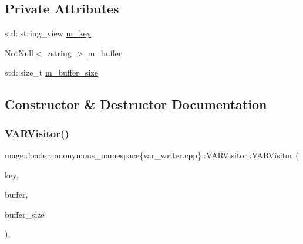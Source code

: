 \subsection*{Private Attributes}
\begin{DoxyCompactItemize}
\item 
std\+::string\+\_\+view \mbox{\hyperlink{classmage_1_1loader_1_1anonymous__namespace_02var__writer_8cpp_03_1_1_v_a_r_visitor_a405fafa3ab059442ca8e741d71a3c4d0}{m\+\_\+key}}
\item 
\mbox{\hyperlink{namespacemage_a8769f9d670d6b585ea306cb1062af94b}{Not\+Null}}$<$ \mbox{\hyperlink{namespacemage_a4163ec9a9a27d5e7f4b452dcb99cb2b9}{zstring}} $>$ \mbox{\hyperlink{classmage_1_1loader_1_1anonymous__namespace_02var__writer_8cpp_03_1_1_v_a_r_visitor_acfd65ace9090295c2f74603a88c2ceab}{m\+\_\+buffer}}
\item 
std\+::size\+\_\+t \mbox{\hyperlink{classmage_1_1loader_1_1anonymous__namespace_02var__writer_8cpp_03_1_1_v_a_r_visitor_a98288b10acf3c45e52574d5d532309d8}{m\+\_\+buffer\+\_\+size}}
\end{DoxyCompactItemize}


\subsection{Constructor \& Destructor Documentation}
\mbox{\label{classmage_1_1loader_1_1anonymous__namespace_02var__writer_8cpp_03_1_1_v_a_r_visitor_a6ca2f3efcddcd80ba43261df803a91bf}} 
\subsubsection{\texorpdfstring{V\+A\+R\+Visitor()}{VARVisitor()}\hspace{0.1cm}{\footnotesize\ttfamily [1/3]}}
{\footnotesize\ttfamily mage\+::loader\+::anonymous\+\_\+namespace\{var\+\_\+writer.\+cpp\}\+::V\+A\+R\+Visitor\+::\+V\+A\+R\+Visitor (\begin{DoxyParamCaption}\item[{std\+::string\+\_\+view}]{key,  }\item[{\mbox{\hyperlink{namespacemage_a8769f9d670d6b585ea306cb1062af94b}{Not\+Null}}$<$ \mbox{\hyperlink{namespacemage_a4163ec9a9a27d5e7f4b452dcb99cb2b9}{zstring}} $>$}]{buffer,  }\item[{std\+::size\+\_\+t}]{buffer\+\_\+size }\end{DoxyParamCaption})\hspace{0.3cm}{\ttfamily [explicit]}, {\ttfamily [noexcept]}}

